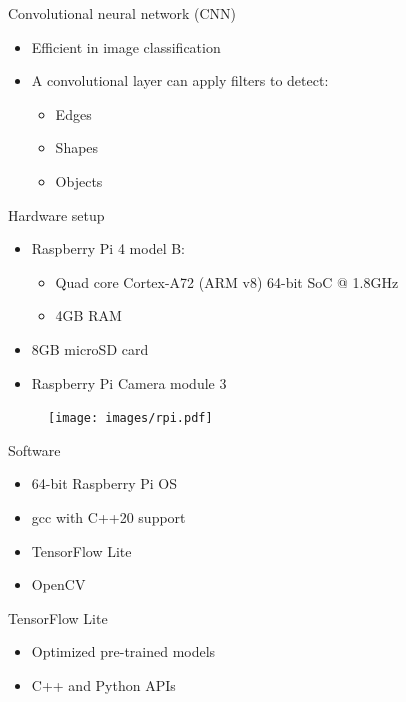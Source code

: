 \begin{frame}{Convolutional neural network (CNN)}
  \begin{itemize}
	\item Efficient in image classification
	\item A convolutional layer can apply filters to detect:
	  \begin{itemize}
		\item Edges
		\item Shapes
		\item Objects
	  \end{itemize}
  \end{itemize}
\end{frame}

\begin{frame}{Hardware setup}
  \begin{itemize}
	\item Raspberry Pi 4 model B:
	  \begin{itemize}
		\item Quad core Cortex-A72 (ARM v8) 64-bit SoC @ 1.8GHz
		\item 4GB RAM
	  \end{itemize}
	\item 8GB microSD card
	\item Raspberry Pi Camera module 3
  \end{itemize}
  \begin{figure}
	\texttt{[image: images/rpi.pdf]}
  \end{figure}
\end{frame}

\begin{frame}{Software}
  \begin{itemize}
	\item 64-bit Raspberry Pi OS
	\item gcc with C++20 support
	\item TensorFlow Lite
	\item OpenCV
  \end{itemize}
\end{frame}

\begin{frame}{TensorFlow Lite}
  \begin{itemize}
	\item Optimized pre-trained models
	\item C++ and Python APIs
  \end{itemize}
\end{frame}

